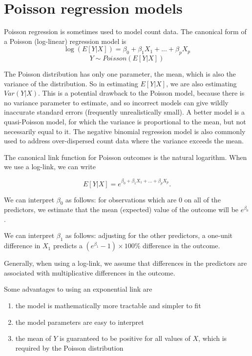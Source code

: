 \documentclass[
  letterpaper,
  DIV=11,
  numbers=noendperiod]{scrreprt}
\begin{document}
\hypertarget{poisson-regression-models}{%
\section{Poisson regression models}\label{poisson-regression-models}}

Poisson regression is sometimes used to model count data. The canonical
form of a Poisson (log-linear) regression model is
\[\log(E[Y|X]) = \beta_0 + \beta_1X_1 + ... + \beta_pX_p\]
\[Y \sim Poisson(E[Y|X])\]

The Poisson distribution has only one parameter, the mean, which is also
the variance of the distribution. So in estimating \(E[Y|X]\), we are
also estimating \(Var(Y|X)\). This is a potential drawback to the
Poisson model, because there is no variance parameter to estimate, and
so incorrect models can give wildly inaccurate standard errors
(frequently unrealistically small). A better model is a quasi-Poisson
model, for which the variance is proportional to the mean, but not
necessarily equal to it. The negative binomial regression model is also
commonly used to address over-dispersed count data where the variance
exceeds the mean.

The canonical link function for Poisson outcomes is the natural
logarithm. When we use a log-link, we can write

\[E[Y|X] = e^{\beta_0 + \beta_1X_1 + ... + \beta_pX_p}.\]

We can interpret \(\beta_0\) as follows: for observations which are 0 on
all of the predictors, we estimate that the mean (expected) value of the
outcome will be \(e^{\beta_0}\).

We can interpret \(\beta_1\) as follows: adjusting for the other
predictors, a one-unit difference in \(X_1\) predicts a
\((e^{\beta_1}-1)\times100 \%\) difference in the outcome.

Generally, when using a log-link, we assume that differences in the
predictors are associated with multiplicative differences in the
outcome.

Some advantages to using an exponential link are

\begin{enumerate}
\def\labelenumi{\arabic{enumi}.}
\item
  the model is mathematically more tractable and simpler to fit
\item
  the model parameters are easy to interpret
\item
  the mean of \(Y\) is guaranteed to be positive for all values of
  \(X\), which is required by the Poisson distribution
\end{enumerate}
\end{document}
